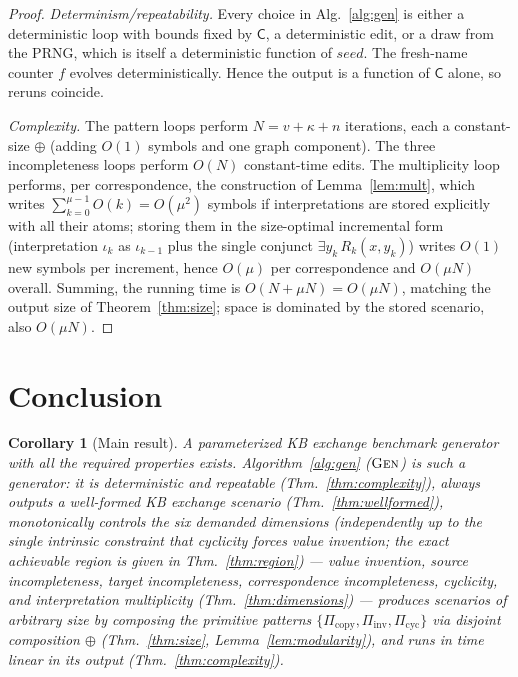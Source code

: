 \documentclass{amsart}
\newtheorem{corollary}{Corollary}
\theoremstyle{definition}
\newcommand{\Cfg}{\mathsf{C}}
\begin{document}
\begin{proof}
\emph{Determinism/repeatability.} Every choice in Alg.~\ref{alg:gen} is either a
deterministic loop with bounds fixed by $\Cfg$, a deterministic edit, or a draw
from the PRNG, which is itself a deterministic function of $\mathit{seed}$. The
fresh-name counter $f$ evolves deterministically. Hence the output is a function
of $\Cfg$ alone, so reruns coincide.

\emph{Complexity.} The pattern loops perform $N=v+\kappa+n$ iterations, each a
constant-size $\oplus$ (adding $O(1)$ symbols and one graph component). The three
incompleteness loops perform $O(N)$ constant-time edits. The multiplicity loop
performs, per correspondence, the construction of Lemma~\ref{lem:mult}, which
writes $\sum_{k=0}^{\mu-1}O(k)=O(\mu^2)$ symbols if interpretations are stored
explicitly with all their atoms; storing them in the size-optimal incremental
form (interpretation $\iota_k$ as $\iota_{k-1}$ plus the single conjunct
$\exists y_k\,R_k(x,y_k)$) writes $O(1)$ new symbols per increment, hence
$O(\mu)$ per correspondence and $O(\mu N)$ overall. Summing, the running time is
$O(N+\mu N)=O(\mu N)$, matching the output size of Theorem~\ref{thm:size}; space
is dominated by the stored scenario, also $O(\mu N)$.
\end{proof}

\section{Conclusion}\label{sec:conc}

\begin{corollary}[Main result]\label{cor:main}
A parameterized KB exchange benchmark generator with all the required properties
exists. Algorithm~\ref{alg:gen} ($\textsc{Gen}$) is such a generator: it is
deterministic and repeatable (Thm.~\ref{thm:complexity}), always outputs a
well-formed KB exchange scenario (Thm.~\ref{thm:wellformed}), monotonically
controls the six demanded dimensions (independently up to the single intrinsic
constraint that cyclicity forces value invention; the exact achievable region is
given in Thm.~\ref{thm:region}) — value invention, source
incompleteness, target incompleteness, correspondence incompleteness, cyclicity,
and interpretation multiplicity (Thm.~\ref{thm:dimensions}) — produces scenarios
of arbitrary size by composing the primitive patterns
$\{\Pi_{\mathrm{copy}},\Pi_{\mathrm{inv}},\Pi_{\mathrm{cyc}}\}$ via disjoint
composition $\oplus$ (Thm.~\ref{thm:size}, Lemma~\ref{lem:modularity}), and runs
in time linear in its output (Thm.~\ref{thm:complexity}).
\end{corollary}
\end{document}
